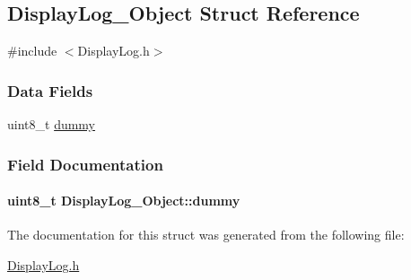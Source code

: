 \subsection{Display\+Log\+\_\+\+Object Struct Reference}
\label{struct_display_log___object}


{\ttfamily \#include $<$Display\+Log.\+h$>$}

\subsubsection*{Data Fields}
\begin{DoxyCompactItemize}
\item 
uint8\+\_\+t \hyperlink{struct_display_log___object_a3063c37a40a74f838412c50cfa965e6f}{dummy}
\end{DoxyCompactItemize}


\subsubsection{Field Documentation}
\paragraph[{dummy}]{\setlength{\rightskip}{0pt plus 5cm}uint8\+\_\+t Display\+Log\+\_\+\+Object\+::dummy}\label{struct_display_log___object_a3063c37a40a74f838412c50cfa965e6f}


The documentation for this struct was generated from the following file\+:\begin{DoxyCompactItemize}
\item 
\hyperlink{_display_log_8h}{Display\+Log.\+h}\end{DoxyCompactItemize}
